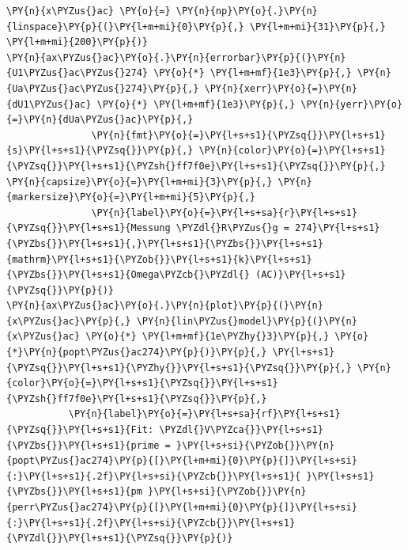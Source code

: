\begin{tcolorbox}[breakable, size=fbox, boxrule=1pt, pad at break*=1mm,colback=cellbackground, colframe=cellborder]
\begin{Verbatim}[commandchars=\\\{\}]
\PY{n}{x\PYZus{}ac} \PY{o}{=} \PY{n}{np}\PY{o}{.}\PY{n}{linspace}\PY{p}{(}\PY{l+m+mi}{0}\PY{p}{,} \PY{l+m+mi}{31}\PY{p}{,} \PY{l+m+mi}{200}\PY{p}{)}
\PY{n}{ax\PYZus{}ac}\PY{o}{.}\PY{n}{errorbar}\PY{p}{(}\PY{n}{U1\PYZus{}ac\PYZus{}274} \PY{o}{*} \PY{l+m+mf}{1e3}\PY{p}{,} \PY{n}{Ua\PYZus{}ac\PYZus{}274}\PY{p}{,} \PY{n}{xerr}\PY{o}{=}\PY{n}{dU1\PYZus{}ac} \PY{o}{*} \PY{l+m+mf}{1e3}\PY{p}{,} \PY{n}{yerr}\PY{o}{=}\PY{n}{dUa\PYZus{}ac}\PY{p}{,}
               \PY{n}{fmt}\PY{o}{=}\PY{l+s+s1}{\PYZsq{}}\PY{l+s+s1}{s}\PY{l+s+s1}{\PYZsq{}}\PY{p}{,} \PY{n}{color}\PY{o}{=}\PY{l+s+s1}{\PYZsq{}}\PY{l+s+s1}{\PYZsh{}ff7f0e}\PY{l+s+s1}{\PYZsq{}}\PY{p}{,} \PY{n}{capsize}\PY{o}{=}\PY{l+m+mi}{3}\PY{p}{,} \PY{n}{markersize}\PY{o}{=}\PY{l+m+mi}{5}\PY{p}{,}
               \PY{n}{label}\PY{o}{=}\PY{l+s+sa}{r}\PY{l+s+s1}{\PYZsq{}}\PY{l+s+s1}{Messung \PYZdl{}R\PYZus{}g = 274}\PY{l+s+s1}{\PYZbs{}}\PY{l+s+s1}{,}\PY{l+s+s1}{\PYZbs{}}\PY{l+s+s1}{mathrm}\PY{l+s+s1}{\PYZob{}}\PY{l+s+s1}{k}\PY{l+s+s1}{\PYZbs{}}\PY{l+s+s1}{Omega\PYZcb{}\PYZdl{} (AC)}\PY{l+s+s1}{\PYZsq{}}\PY{p}{)}
\PY{n}{ax\PYZus{}ac}\PY{o}{.}\PY{n}{plot}\PY{p}{(}\PY{n}{x\PYZus{}ac}\PY{p}{,} \PY{n}{lin\PYZus{}model}\PY{p}{(}\PY{n}{x\PYZus{}ac} \PY{o}{*} \PY{l+m+mf}{1e\PYZhy{}3}\PY{p}{,} \PY{o}{*}\PY{n}{popt\PYZus{}ac274}\PY{p}{)}\PY{p}{,} \PY{l+s+s1}{\PYZsq{}}\PY{l+s+s1}{\PYZhy{}}\PY{l+s+s1}{\PYZsq{}}\PY{p}{,} \PY{n}{color}\PY{o}{=}\PY{l+s+s1}{\PYZsq{}}\PY{l+s+s1}{\PYZsh{}ff7f0e}\PY{l+s+s1}{\PYZsq{}}\PY{p}{,}
           \PY{n}{label}\PY{o}{=}\PY{l+s+sa}{rf}\PY{l+s+s1}{\PYZsq{}}\PY{l+s+s1}{Fit: \PYZdl{}V\PYZca{}}\PY{l+s+s1}{\PYZbs{}}\PY{l+s+s1}{prime = }\PY{l+s+si}{\PYZob{}}\PY{n}{popt\PYZus{}ac274}\PY{p}{[}\PY{l+m+mi}{0}\PY{p}{]}\PY{l+s+si}{:}\PY{l+s+s1}{.2f}\PY{l+s+si}{\PYZcb{}}\PY{l+s+s1}{ }\PY{l+s+s1}{\PYZbs{}}\PY{l+s+s1}{pm }\PY{l+s+si}{\PYZob{}}\PY{n}{perr\PYZus{}ac274}\PY{p}{[}\PY{l+m+mi}{0}\PY{p}{]}\PY{l+s+si}{:}\PY{l+s+s1}{.2f}\PY{l+s+si}{\PYZcb{}}\PY{l+s+s1}{\PYZdl{}}\PY{l+s+s1}{\PYZsq{}}\PY{p}{)}


\end{Verbatim}
\end{tcolorbox}
